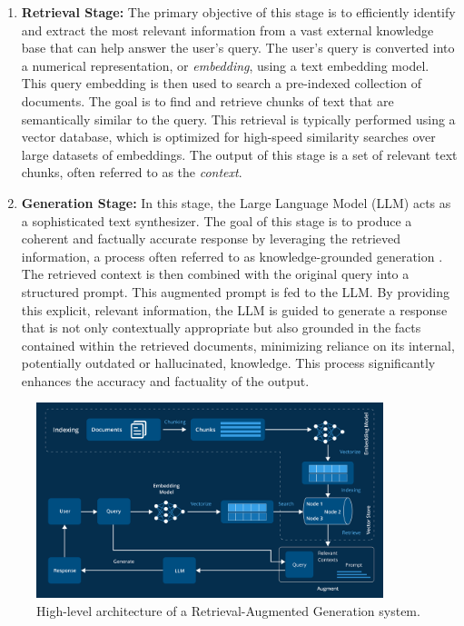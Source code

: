 \begin{enumerate}
    \item \textbf{Retrieval Stage:} The primary objective of this stage is to efficiently identify and extract the most relevant information from a vast external knowledge base that can help answer the user's query. The user's query is converted into a numerical representation, or \textit{embedding}, using a text embedding model. This query embedding is then used to search a pre-indexed collection of documents. The goal is to find and retrieve chunks of text that are semantically similar to the query. This retrieval is typically performed using a vector database, which is optimized for high-speed similarity searches over large datasets of embeddings. The output of this stage is a set of relevant text chunks, often referred to as the \textit{context}.

    
    \item \textbf{Generation Stage:} In this stage, the Large Language Model (LLM) acts as a sophisticated text synthesizer. The goal of this stage is to produce a coherent and factually accurate response by leveraging the retrieved information, a process often referred to as knowledge-grounded generation \autocite{yu2022survey}. The retrieved context is then combined with the original query into a structured prompt. This augmented prompt is fed to the LLM. By providing this explicit, relevant information, the LLM is guided to generate a response that is not only contextually appropriate but also grounded in the facts contained within the retrieved documents, minimizing reliance on its internal, potentially outdated or hallucinated, knowledge. This process significantly enhances the accuracy and factuality of the output.
\end{enumerate}

\begin{figure}[!htbp]
    \centering
    \includegraphics[width=0.9\textwidth]{images/chapter2/rag_architecture_2.png}
    \caption{High-level architecture of a Retrieval-Augmented Generation system.}
    \label{fig:rag_architecture}
\end{figure}

